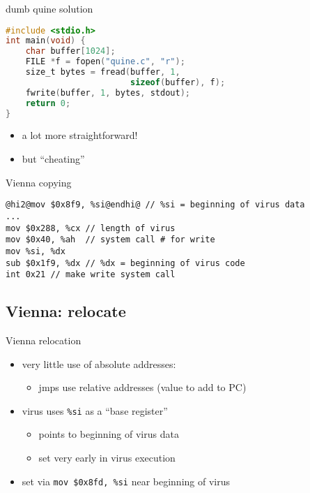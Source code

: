\begin{frame}[fragile,label=quineDumb]{dumb quine solution}
\begin{lstlisting}[language=C,style=small]
#include <stdio.h>
int main(void) {
    char buffer[1024];
    FILE *f = fopen("quine.c", "r");
    size_t bytes = fread(buffer, 1,
                         sizeof(buffer), f);
    fwrite(buffer, 1, bytes, stdout);
    return 0;
}
\end{lstlisting}
\begin{itemize}
\item a lot more straightforward!
\item but ``cheating''
\end{itemize}
\end{frame}

\begin{frame}[fragile,label=virusWriting]{Vienna copying}
\begin{lstlisting}
@hi2@mov $0x8f9, %si@endhi@ // %si = beginning of virus data
...
mov $0x288, %cx // length of virus
mov $0x40, %ah  // system call # for write
mov %si, %dx
sub $0x1f9, %dx // %dx = beginning of virus code
int 0x21 // make write system call
\end{lstlisting}
\end{frame}


\subsection{Vienna: relocate}

\begin{frame}[fragile,label=viennaReloc1]{Vienna relocation}
    \begin{itemize}
    \item very little use of absolute addresses:
        \begin{itemize}
        \item jmps use relative addresses (value to add to PC)
        \end{itemize}
    \item virus uses {\tt \%si} as a ``base register''
        \begin{itemize}
        \item points to beginning of virus data
        \item set very early in virus execution
        \end{itemize}
    \item set via \lstinline|mov $0x8fd, %si| near beginning of virus
    \end{itemize}
\end{frame}

